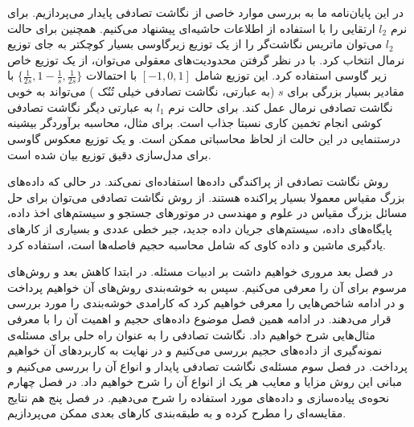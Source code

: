 در این پایان‌نامه ما به بررسی موارد خاصی از نگاشت تصادفی پایدار می‌پردازیم. برای نرم 
$l_2$
ارتقایی را با استفاده از اطلاعات حاشیه‌ای پیشنهاد می‌کنیم. همچنین برای حالت $l_2$ می‌توان ماتریس نگاشت‌گر را از یک توزیع زیرگاوسی%
بسیار کوچکتر به جای توزیع نرمال انتخاب کرد. با در نظر گرفتن محدودیت‌های معقولی می‌توان، از یک توزیع خاص زیر گاوسی استفاده کرد. این توزیع شامل 
$[-1,0,1]$
با احتمالات 
$\{ \frac{1}{2s}, 1-\frac{1}{s}, \frac{1}{2s} \}$
با مقادیر بسیار بزرگی برای 
‌‌‌$s$
(به عبارتی، نگاشت تصادفی خیلی تُنُک %
) می‌تواند به خوبی نگاشت تصادفی نرمال عمل کند. برای حالت نرم 
$l_1$
به عبارتی دیگر نگاشت تصادفی کوشی %
انجام تخمین کاری نسبتا جذاب است. برای مثال، محاسبه برآوردگر بیشینه درستنمایی 
در این حالت از لحاظ محاسباتی ممکن است. و یک توزیع معکوس گاوسی %
برای مدل‌سازی دقیق توزیع 
بیان شده است.

روش نگاشت تصادفی از پراکندگی داده‌ها استفاده‌ای نمی‌کند. در حالی که داده‌های بزرگ مقیاس معمولا بسیار پراکنده هستند. از روش نگاشت تصادفی می‌توان برای حل مسائل بزرگ مقیاس در علوم و مهندسی در موتورهای جستجو و سیستم‌های اخذ داده، پایگاه‌های داده، سیستم‌های جریان داده جدید، جبر خطی عددی و بسیاری از کارهای یادگیری ماشین و داده کاوی که شامل محاسبه حجیم فاصله‌ها است، استفاده کرد.

در فصل بعد مروری خواهیم داشت بر ادبیات مسئله. در ابتدا کاهش بعد و روش‌های مرسوم برای آن را معرفی می‌کنیم. سپس به خوشه‌بندی روش‌های آن خواهیم پرداخت و در ادامه شاخص‌هایی را معرفی خواهیم کرد که کارامدی خوشه‌بندی را مورد بررسی قرار می‌دهند. در ادامه همین فصل موضوع داده‌های حجیم و اهمیت آن را با معرفی مثال‌هایی شرح خواهیم داد. نگاشت تصادفی را به عنوان راه حلی برای مسئله‌ی نمونه‌گیری از داده‌های حجیم بررسی می‌کنیم و در نهایت به کاربردهای آن خواهیم پرداخت. در فصل سوم مسئله‌ی نگاشت تصادفی پایدار و انواع آن را بررسی می‌کنیم و مبانی این روش مزایا و معایب هر یک از انواع آن را شرح خواهیم داد. در فصل چهارم نحوه‌ی پیاده‌سازی و داده‌های مورد استفاده را شرح می‌دهیم. در فصل پنج هم نتایج مقایسه‌ای را مطرح کرده و به طبقه‌بندی کارهای بعدی ممکن می‌پردازیم.







